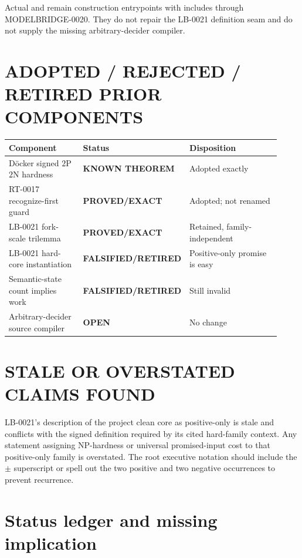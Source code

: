 \documentclass[11pt]{article}
\newcommand{\EXACT}{\textbf{PROVED/EXACT}}
\newcommand{\KNOWN}{\textbf{KNOWN THEOREM}}
\newcommand{\OPEN}{\textbf{OPEN}}
\newcommand{\RETIRED}{\textbf{FALSIFIED/RETIRED}}
\begin{document}
Actual  and  remain construction
entrypoints with includes through MODELBRIDGE-0020.  They do not repair the
LB-0021 definition seam and do not supply the missing arbitrary-decider
compiler.

\section{ADOPTED / REJECTED / RETIRED PRIOR COMPONENTS}

\begin{center}\scriptsize
\begin{tabular}{@{}p{0.31\linewidth}p{0.20\linewidth}p{0.41\linewidth}@{}}
\toprule
Component & Status & Disposition\\
\midrule
D\"ocker signed $2$P$2$N hardness & \KNOWN & Adopted exactly\\
RT-0017 recognize-first guard & \EXACT & Adopted; not renamed\\
LB-0021 fork-scale trilemma & \EXACT & Retained, family-independent\\
LB-0021 hard-core instantiation & \RETIRED & Positive-only promise is easy\\
Semantic-state count implies work & \RETIRED & Still invalid\\
Arbitrary-decider source compiler & \OPEN & No change\\
\bottomrule
\end{tabular}
\end{center}

\section{STALE OR OVERSTATED CLAIMS FOUND}

LB-0021's description of the project clean core as positive-only is stale
and conflicts with the signed definition required by its cited hard-family
context.  Any statement assigning NP-hardness or universal promised-input
cost to that positive-only family is overstated.  The root executive
notation should include the $\pm$ superscript or spell out the two positive
and two negative occurrences to prevent recurrence.

\section{Status ledger and missing implication}
\end{document}
